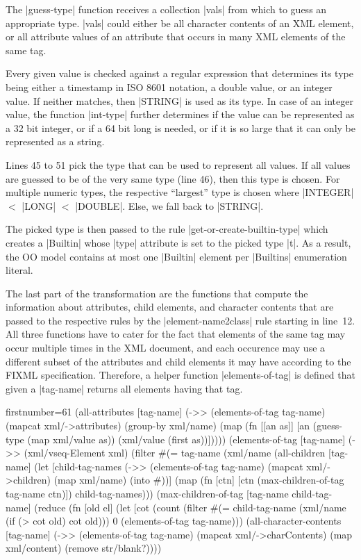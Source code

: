 \documentclass[a4paper]{article}
\newcommand{\code}{\clojureinline}
\begin{document}
The \code|guess-type| function receives a collection \code|vals| from which to
guess an appropriate type.  \code|vals| could either be all character contents
of an XML element, or all attribute values of an attribute that occurs in many
XML elements of the same tag.

Every given value is checked against a regular expression that determines its
type being either a timestamp in ISO 8601 notation, a double value, or an
integer value.  If neither matches, then \code|STRING| is used as its type.  In
case of an integer value, the function \code|int-type| further determines if
the value can be represented as a 32 bit integer, or if a 64 bit long is
needed, or if it is so large that it can only be represented as a string.

Lines 45 to 51 pick the type that can be used to represent all values.  If all
values are guessed to be of the very same type (line 46), then this type is
chosen.  For multiple numeric types, the respective ``largest'' type is chosen
where \code|INTEGER| \(<\)
\code|LONG| \(<\) \code|DOUBLE|.  Else, we fall back to \code|STRING|.

The picked type is then passed to the rule \code|get-or-create-builtin-type|
which creates a \code|Builtin| whose \code|type| attribute is set to the picked
type \code|t|.  As a result, the OO model contains at most one \code|Builtin|
element per \code|Builtins| enumeration literal.

The last part of the transformation are the functions that compute the
information about attributes, child elements, and character contents that are
passed to the respective rules by the \code|element-name2class| rule starting
in line~12.  All three functions have to cater for the fact that elements of
the same tag may occur multiple times in the XML document, and each occurence
may use a different subset of the attributes and child elements it may have
according to the FIXML specification.  Therefore, a helper function
\code|elements-of-tag| is defined that given a \code|tag-name| returns all
elements having that tag.

\begin{clojurecode*}{firstnumber=61}
  (all-attributes [tag-name]
   (->> (elements-of-tag tag-name) (mapcat xml/->attributes) (group-by xml/name)
        (map (fn [[an as]]
               [an (guess-type (map xml/value as)) (xml/value (first as))]))))
  (elements-of-tag [tag-name]
   (->> (xml/vseq-Element xml) (filter #(= tag-name (xml/name %
  (all-children [tag-name]
   (let [child-tag-names (->> (elements-of-tag tag-name) (mapcat xml/->children)
                              (map xml/name) (into #{}))]
     (map (fn [ctn] [ctn (max-children-of-tag tag-name ctn)]) child-tag-names)))
  (max-children-of-tag [tag-name child-tag-name]
   (reduce (fn [old el]
             (let [cot (count (filter #(= child-tag-name (xml/name %
               (if (> cot old) cot old)))
               0 (elements-of-tag tag-name)))
  (all-character-contents [tag-name]
   (->> (elements-of-tag tag-name) (mapcat xml/->charContents)
        (map xml/content) (remove str/blank?))))
\end{clojurecode*}
\end{document}
